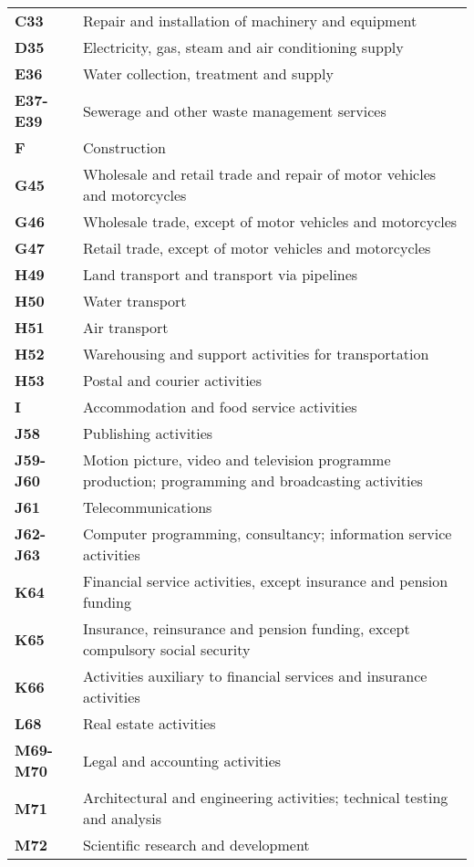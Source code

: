 \documentclass[11pt,a4paper]{article}
\begin{document}
\begin{table}[!h]
\begin{tabular}{ll}
\textbf{C33} &{Repair and installation of machinery and equipment}\\
\textbf{D35} &{Electricity, gas, steam and air conditioning supply}\\
\textbf{E36} &{Water collection, treatment and supply}\\
\textbf{E37-E39} &{Sewerage and other waste management services}\\
\textbf{F} &{Construction}\\
\textbf{G45} &{Wholesale and retail trade and repair of motor vehicles and motorcycles}\\
\textbf{G46} &{Wholesale trade, except of motor vehicles and motorcycles}\\
\textbf{G47} &{Retail trade, except of motor vehicles and motorcycles}\\
\textbf{H49} &{Land transport and transport via pipelines}\\
\textbf{H50} &{Water transport}\\
\textbf{H51} &{Air transport}\\
\textbf{H52} &{Warehousing and support activities for transportation}\\
\textbf{H53} &{Postal and courier activities}\\
\textbf{I} &{Accommodation and food service activities}\\
\textbf{J58} &{Publishing activities}\\
\textbf{J59-J60} &{Motion picture, video and television programme production; programming and broadcasting activities}\\
\textbf{J61} &{Telecommunications}\\
\textbf{J62-J63} &{Computer programming, consultancy; information service activities}\\
\textbf{K64} &{Financial service activities, except insurance and pension funding}\\
\textbf{K65} &{Insurance, reinsurance and pension funding, except compulsory social security}\\
\textbf{K66} &{Activities auxiliary to financial services and insurance activities}\\
\textbf{L68} &{Real estate activities}\\
\textbf{M69-M70} &{Legal and accounting activities}\\
\textbf{M71} &{Architectural and engineering activities; technical testing and analysis}\\
\textbf{M72} &{Scientific research and development}\\

\end{tabular}
\end{table}
\end{document}

